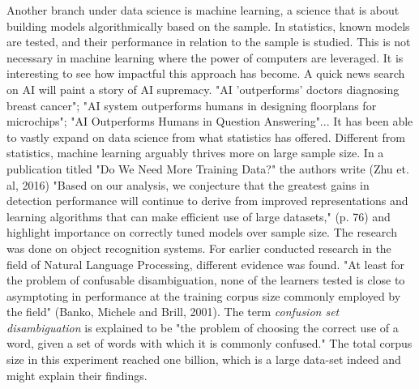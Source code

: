 \documentclass[11pt]{article}
\begin{document}
Another branch under data science is machine learning, a science that is about building models algorithmically based on the sample. In statistics, known models are tested, and their performance in relation to the sample is studied. This is not necessary in machine learning where the power of computers are leveraged. It is interesting to see how impactful this approach has become. A quick news search on AI will paint a story of AI supremacy. "AI 'outperforms' doctors diagnosing breast cancer"; "AI system outperforms humans in designing floorplans for microchips"; "AI Outperforms Humans in Question Answering"... It has been able to vastly expand on data science from what statistics has offered. Different from statistics, machine learning arguably thrives more on large sample size. In a publication titled "Do We Need More Training Data?" the authors write (Zhu et. al, 2016) "Based on our analysis, we conjecture that the greatest gains in detection performance will continue to derive from improved representations and learning algorithms that can make efficient use of large datasets," (p. 76) and highlight importance on correctly tuned models over sample size. The research was done on object recognition systems. For earlier conducted research in the field of Natural Language Processing, different evidence was found. "At least for the problem of confusable disambiguation, none of the learners tested is close to asymptoting in performance at the training corpus size commonly employed by the field" (Banko, Michele and Brill, 2001). The term \textit{confusion set disambiguation} is explained to be "the problem of choosing the correct use of a word, given a set of words with which it is commonly confused." The total corpus size in this experiment reached one billion, which is a large data-set indeed and might explain their findings. \\ \\
\end{document}
